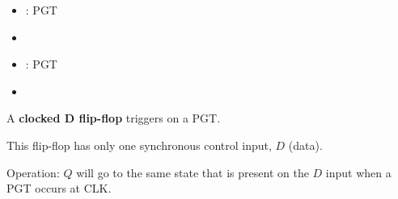 \begin{itemize}
  \item {}: PGT
  \item {}
\end{itemize}

\begin{itemize}
  \item {}: PGT
  \item {}
\end{itemize}

  \par A \textbf{clocked D flip-flop} triggers on a PGT.
  \par This flip-flop has only one synchronous control input, $D$ (data).
  \par Operation: $Q$ will go to the same state that is present on the $D$ input
  when a PGT occurs at CLK.
